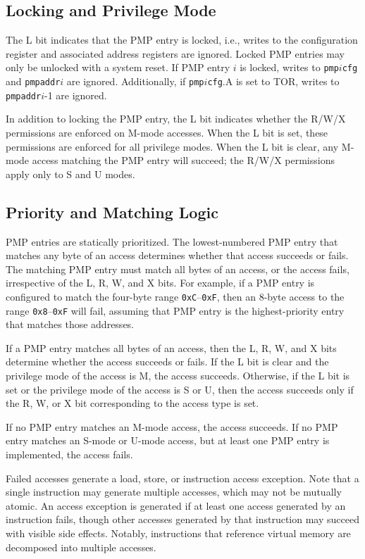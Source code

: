 \subsection{Locking and Privilege Mode}

The L bit indicates that the PMP entry is locked, i.e., writes to the
configuration register and associated address registers are ignored.  Locked
PMP entries may only be unlocked with a system reset.  If PMP entry $i$ is
locked, writes to \texttt{pmp}$i$\texttt{cfg} and \texttt{pmpaddr}$i$ are ignored.
Additionally, if \texttt{pmp}$i$\texttt{cfg}.A is set to TOR, writes to {\tt
pmpaddr}$i$-1 are ignored.

In addition to locking the PMP entry, the L bit indicates whether the R/W/X
permissions are enforced on M-mode accesses.  When the L bit is set, these
permissions are enforced for all privilege modes.  When the L bit is clear,
any M-mode access matching the PMP entry will succeed; the R/W/X
permissions apply only to S and U modes.

\subsection{Priority and Matching Logic}

PMP entries are statically prioritized.  The lowest-numbered PMP entry that
matches any byte of an access determines whether that access succeeds or
fails.  The matching PMP entry must match all bytes of an access, or the
access fails, irrespective of the L, R, W, and X bits.  For example, if a PMP
entry is configured to match the four-byte range \texttt{0xC}--\texttt{0xF}, then an
8-byte access to the range \texttt{0x8}--\texttt{0xF} will fail, assuming that
PMP entry is the highest-priority entry that matches those addresses.

If a PMP entry matches all bytes of an access, then the L, R, W, and X bits
determine whether the access succeeds or fails.  If the L bit is clear and the
privilege mode of the access is M, the access succeeds.  Otherwise, if the
L bit is set or the privilege mode of the access is S or U, then the access
succeeds only if the R, W, or X bit corresponding to the access type is set.

If no PMP entry matches an M-mode access, the access succeeds.  If no PMP
entry matches an S-mode or U-mode access, but at least one PMP entry is
implemented, the access fails.

Failed accesses generate a load, store, or instruction access exception.  Note
that a single instruction may generate multiple accesses, which may not be
mutually atomic.  An access exception is generated if at least one access
generated by an instruction fails, though other accesses generated by that
instruction may succeed with visible side effects.  Notably, instructions that
reference virtual memory are decomposed into multiple accesses.

